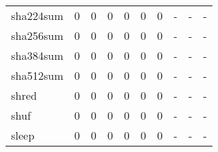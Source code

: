 \begin{longtable}{lp{2.0cm}p{2.0cm}p{2.0cm}p{2.0cm}p{2.0cm}p{2.0cm}p{2.0cm}p{2.0cm}p{2.0cm}}
sha224sum &                      0 &                                             0 &                                            0 &                                           0 &                                            0 &                                          0 &                                    - &                                      - &                                    - \\
sha256sum &                      0 &                                             0 &                                            0 &                                           0 &                                            0 &                                          0 &                                    - &                                      - &                                    - \\
sha384sum &                      0 &                                             0 &                                            0 &                                           0 &                                            0 &                                          0 &                                    - &                                      - &                                    - \\
sha512sum &                      0 &                                             0 &                                            0 &                                           0 &                                            0 &                                          0 &                                    - &                                      - &                                    - \\
shred     &                      0 &                                             0 &                                            0 &                                           0 &                                            0 &                                          0 &                                    - &                                      - &                                    - \\
shuf      &                      0 &                                             0 &                                            0 &                                           0 &                                            0 &                                          0 &                                    - &                                      - &                                    - \\
sleep     &                      0 &                                             0 &                                            0 &                                           0 &                                            0 &                                          0 &                                    - &                                      - &                                    - \\

\end{longtable}
